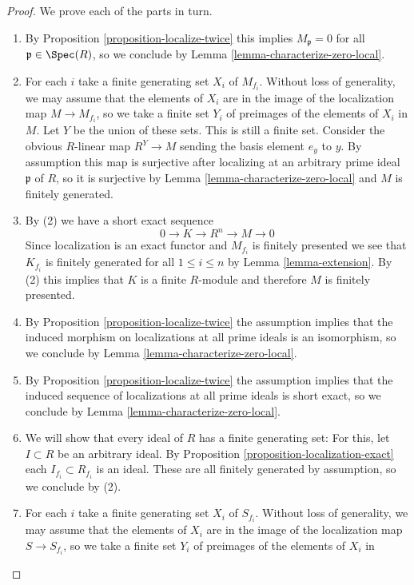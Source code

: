 \begin{proof}
We prove each of the parts in turn.
\begin{enumerate}
\item By Proposition \ref{proposition-localize-twice}
this implies $M_\mathfrak p = 0$ for all $\mathfrak p \in \Spec(R)$,
so we conclude by Lemma \ref{lemma-characterize-zero-local}.
\item For each $i$ take a finite generating set $X_i$ of $M_{f_i}$.
Without loss of generality, we may assume that the elements of $X_i$ are
in the image of the localization map $M \rightarrow M_{f_i}$, so we take
a finite set $Y_i$ of preimages of the elements of $X_i$ in $M$. Let $Y$
be the union of these sets. This is still a finite set.
Consider the obvious $R$-linear map $R^Y \rightarrow M$ sending the basis
element $e_y$ to $y$. By assumption this map is surjective after localizing
at an arbitrary prime ideal $\mathfrak p$ of $R$, so it is surjective by
Lemma \ref{lemma-characterize-zero-local}
and $M$ is finitely generated.
\item By (2) we have a short exact sequence
$$
0 \rightarrow K \rightarrow R^n \rightarrow M \rightarrow 0
$$
Since localization is an exact functor and $M_{f_i}$ is finitely
presented we see that $K_{f_i}$ is finitely generated for all
$1 \leq i \leq n$ by Lemma \ref{lemma-extension}.
By (2) this implies that $K$ is a finite $R$-module and therefore
$M$ is finitely presented.
\item By Proposition \ref{proposition-localize-twice}
the assumption implies that the induced morphism
on localizations at all prime ideals is an isomorphism, so we conclude
by Lemma \ref{lemma-characterize-zero-local}.
\item By Proposition \ref{proposition-localize-twice} the assumption
implies that the induced
sequence of localizations at all prime ideals is short exact, so we
conclude by Lemma \ref{lemma-characterize-zero-local}.
\item We will show that every ideal of $R$ has a finite generating set:
For this, let $I \subset R$ be an arbitrary ideal. By
Proposition \ref{proposition-localization-exact}
each $I_{f_i} \subset R_{f_i}$ is an ideal. These are all
finitely generated by assumption, so we conclude by (2).
\item For each $i$ take a finite generating set $X_i$ of $S_{f_i}$.
Without loss of generality, we may assume that the elements of $X_i$
are in the image of the localization map $S \rightarrow S_{f_i}$, so
we take a finite set $Y_i$ of preimages of the elements of $X_i$ in

\end{enumerate}
\end{proof}
